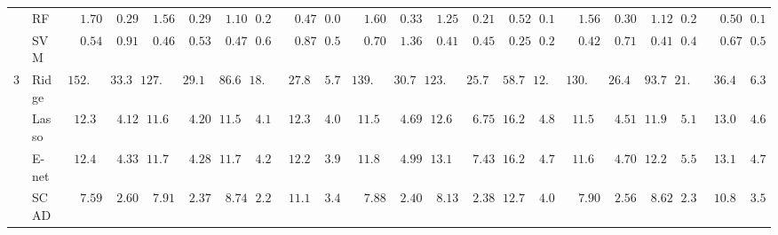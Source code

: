 \begin{tabular}{p{0.2cm}p{1cm}|p{0.6cm}p{0.6cm}|p{0.6cm}p{0.6cm}p{0.6cm}p{0.6cm}p{0.6cm}p{0.6cm}|p{0.6cm}p{0.6cm}p{0.6cm}p{0.6cm}p{0.6cm}p{0.6cm}|p{0.6cm}p{0.6cm}p{0.6cm}p{0.6cm}p{0.6cm}p{0.6cm}}
 & RF  & $\phantom{00}1.70$ & $\phantom{00}0.29$ & $\phantom{00}1.56$ & $\phantom{00}0.29$ & $\phantom{00}1.10$ & $\phantom{0}0.20$ & $\phantom{00}0.47$ & $\phantom{0}0.09$ & $\phantom{00}1.60$ & $\phantom{00}0.33$ & $\phantom{00}1.25$ & $\phantom{00}0.21$ & $\phantom{00}0.52$ & $\phantom{0}0.13$ & $\phantom{00}1.56$ & $\phantom{00}0.30$ & $\phantom{00}1.12$ & $\phantom{0}0.20$ & $\phantom{00}0.50$ & $\phantom{0}0.11$ \\
 & SVM  & $\phantom{00}0.54$ & $\phantom{00}0.91$ & $\phantom{00}0.46$ & $\phantom{00}0.53$ & $\phantom{00}0.47$ & $\phantom{0}0.61$ & $\phantom{00}0.87$ & $\phantom{0}0.53$ & $\phantom{00}0.70$ & $\phantom{00}1.36$ & $\phantom{00}0.41$ & $\phantom{00}0.45$ & $\phantom{00}0.25$ & $\phantom{0}0.24$ & $\phantom{00}0.42$ & $\phantom{00}0.71$ & $\phantom{00}0.41$ & $\phantom{0}0.40$ & $\phantom{00}0.67$ & $\phantom{0}0.55$ \\\hline
3 & Ridge  & $152.82$ & $\phantom{0}33.38$ & $127.16$ & $\phantom{0}29.14$ & $\phantom{0}86.66$ & $18.70$ & $\phantom{0}27.80$ & $\phantom{0}5.77$ & $139.47$ & $\phantom{0}30.76$ & $123.60$ & $\phantom{0}25.72$ & $\phantom{0}58.74$ & $12.46$ & $130.48$ & $\phantom{0}26.46$ & $\phantom{0}93.78$ & $21.72$ & $\phantom{0}36.47$ & $\phantom{0}6.31$ \\
 & Lasso  & $\phantom{0}12.35$ & $\phantom{00}4.12$ & $\phantom{0}11.64$ & $\phantom{00}4.20$ & $\phantom{0}11.51$ & $\phantom{0}4.13$ & $\phantom{0}12.31$ & $\phantom{0}4.03$ & $\phantom{0}11.52$ & $\phantom{00}4.69$ & $\phantom{0}12.66$ & $\phantom{00}6.75$ & $\phantom{0}16.20$ & $\phantom{0}4.87$ & $\phantom{0}11.52$ & $\phantom{00}4.51$ & $\phantom{0}11.97$ & $\phantom{0}5.15$ & $\phantom{0}13.05$ & $\phantom{0}4.69$ \\
 & E-net  & $\phantom{0}12.40$ & $\phantom{00}4.33$ & $\phantom{0}11.79$ & $\phantom{00}4.28$ & $\phantom{0}11.71$ & $\phantom{0}4.24$ & $\phantom{0}12.24$ & $\phantom{0}3.99$ & $\phantom{0}11.80$ & $\phantom{00}4.99$ & $\phantom{0}13.10$ & $\phantom{00}7.43$ & $\phantom{0}16.28$ & $\phantom{0}4.73$ & $\phantom{0}11.69$ & $\phantom{00}4.70$ & $\phantom{0}12.28$ & $\phantom{0}5.57$ & $\phantom{0}13.17$ & $\phantom{0}4.74$ \\
 & SCAD  & $\phantom{00}7.59$ & $\phantom{00}2.60$ & $\phantom{00}7.91$ & $\phantom{00}2.37$ & $\phantom{00}8.74$ & $\phantom{0}2.22$ & $\phantom{0}11.14$ & $\phantom{0}3.41$ & $\phantom{00}7.88$ & $\phantom{00}2.40$ & $\phantom{00}8.13$ & $\phantom{00}2.38$ & $\phantom{0}12.79$ & $\phantom{0}4.04$ & $\phantom{00}7.90$ & $\phantom{00}2.56$ & $\phantom{00}8.62$ & $\phantom{0}2.33$ & $\phantom{0}10.80$ & $\phantom{0}3.56$ \\

\end{tabular}
